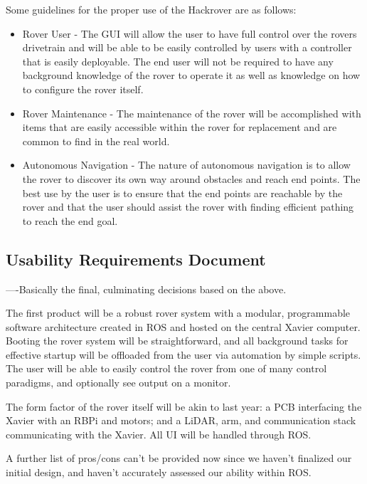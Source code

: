 \documentclass[a4paper, 10pt]{article}
\begin{document}
	Some guidelines for the proper use of the Hackrover are as follows:

	\begin{itemize}
		\item
		Rover User - The GUI will allow the user to have full control over the rovers drivetrain and will be able to be easily controlled by users with a controller that is easily deployable. The end user will not be required to have any background knowledge of the rover to operate it as well as knowledge on how to configure the rover itself.

		\item
		Rover Maintenance - The maintenance of the rover will be accomplished with items that are easily accessible within the rover for replacement and are common to find in the real world.

		\item
		Autonomous Navigation - The nature of autonomous navigation is to allow the rover to discover its own way around obstacles and reach end points. The best use by the user is to ensure that the end points are reachable by the rover and that the user should assist the rover with finding efficient pathing to reach the end goal. 
\end{itemize}
	
	\subsection{Usability Requirements Document}
	----Basically the final, culminating decisions based on the above.
	
	The first product will be a robust rover system with a modular, programmable software architecture created in ROS and hosted on the central Xavier computer. Booting the rover system will be straightforward, and all background tasks for effective startup will be offloaded from the user via automation by simple scripts. The user will be able to easily control the rover from one of many control paradigms, and optionally see output on a monitor. 
	
The form factor of the rover itself will be akin to last year: a PCB interfacing the Xavier with an RBPi and motors; and a LiDAR, arm, and communication stack communicating with the Xavier. All UI will be handled through ROS. 

A further list of pros/cons can't be provided now since we haven't finalized our initial design, and haven't accurately assessed our ability within ROS.
\end{document}
